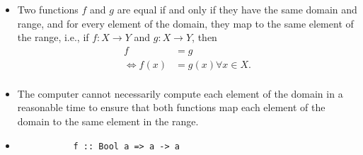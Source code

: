 \begin{itemize}
    \item[(a)] Two functions $f$ and $g$ are equal if and only if they have
        the same domain and range, and for every element of the domain, they
        map to the same element of the range, i.e., if $f: X \to Y$ and $g: X \to Y$,
        then
        \begin{equation*}
            \begin{split}
                f &= g \\
                \Leftrightarrow f(x) &= g(x) \forall x \in X. \\
            \end{split}
        \end{equation*}
    \item[(b)] The computer cannot necessarily compute each element of the domain
        in a reasonable time to ensure that both functions map each element of the 
        domain to the same element in the range.
    \item[(c)] 
        \begin{lstlisting}
           f :: Bool a => a -> a 
        \end{lstlisting}
\end{itemize}

